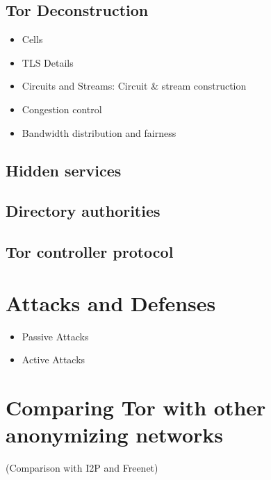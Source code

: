 \documentclass{llncs}
\begin{document}
\subsection{Tor Deconstruction}
\begin{itemize}
	\item{Cells}
	\item{TLS Details}
	\item{Circuits and Streams: Circuit \& stream construction}
	\item{Congestion control}
	\item{Bandwidth distribution and fairness}
\end{itemize}
\subsection{Hidden services}
\subsection{Directory authorities}
\subsection{Tor controller protocol}

\section{Attacks and Defenses} \label{tor_attack_defence}
\begin{itemize}
	\item{Passive Attacks}
	
	\item{Active Attacks}
\end{itemize}

\section{Comparing Tor with other anonymizing networks} \label{comparison}
(Comparison with I2P and Freenet)
\end{document}
